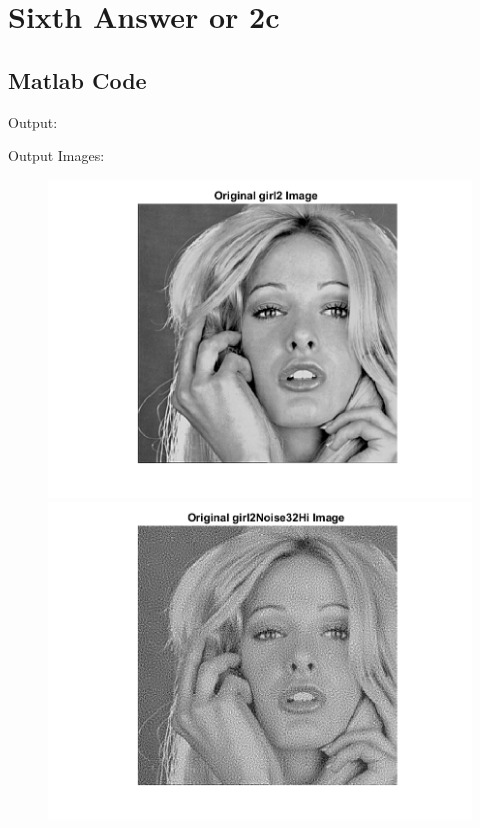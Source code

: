 \documentclass[11pt]{article} %
\begin{document}
\section {Sixth Answer or 2c}
\subsection*{Matlab Code}


Output:


Output Images: 
\begin{figure}
 \centering
	\includegraphics{2ca.png}
	\includegraphics{2cb.png}
\end{figure}
\end{document}
